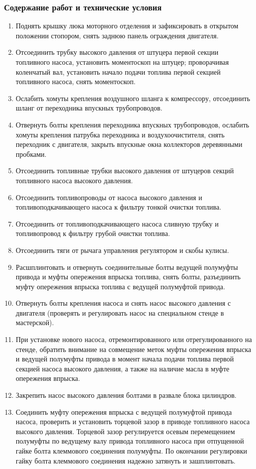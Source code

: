 \subsubsection{Содержание работ и технические условия}
\begin{enumerate}
    \item Поднять крышку люка моторного отделения и зафиксировать в открытом положении стопором, снять заднюю панель ограждения двигателя. 
    \item Отсоединить трубку высокого давления от штуцера первой секции топливного насоса, установить моментоскоп на штуцер; проворачивая коленчатый вал, установить начало подачи топлива первой секцией топливного насоса, снять моментоскоп. 
    \item Ослабить хомуты крепления воздушного шланга к компрессору, отсоединить шланг от переходника впускных трубопроводов. 
    \item Отвернуть болты крепления переходника впускных трубопроводов, ослабить хомуты крепления патрубка переходника и воздухоочистителя, снять переходник с двигателя, закрыть впускные окна коллекторов деревянными пробками. 
    \item Отсоединить топливные трубки высокого давления от штуцеров секций топливного насоса высокого давления. 
    \item Отсоединить топливопроводы от насоса высокого давления и топливоподкачивающего насоса к фильтру тонкой очистки топлива. 
    \item Отсоединить от топливоподкачивающего насоса сливную трубку и топливопровод к фильтру грубой очистки топлива. 
    \item Отсоединить тяги от рычага управления регулятором и скобы кулисы. 
    \item Расшплинтовать и отвернуть соединительные болты ведущей полумуфты привода и муфты опережения впрыска топлива, снять болты, разъединить муфту опережения впрыска топлива с ведущей полумуфтой привода. 
    \item Отвернуть болты крепления насоса и снять насос высокого давления с двигателя (проверять и регулировать насос на специальном стенде в мастерской). 
    \item При установке нового насоса, отремонтированного или отрегулированного на стенде, обратить внимание на совмещение меток муфты опережения впрыска и ведущей полумуфты привода в момент начала подачи топлива первой секцией насоса высокого давления, а также на наличие масла в муфте опережения впрыска. 
    \item Закрепить насос высокого давления болтами в развале блока цилиндров. 
    \item Соединить муфту опережения впрыска с ведущей полумуфтой привода насоса, проверить и установить торцевой зазор в приводе топливного насоса высокого давления. Торцевой зазор регулируется осевым перемещением полумуфты по ведущему валу привода топливного насоса при отпущенной гайке болта клеммового соединения полумуфты. По окончании регулировки гайку болта клеммового соединения надежно затянуть и зашплинтовать. 
        

\end{enumerate}
